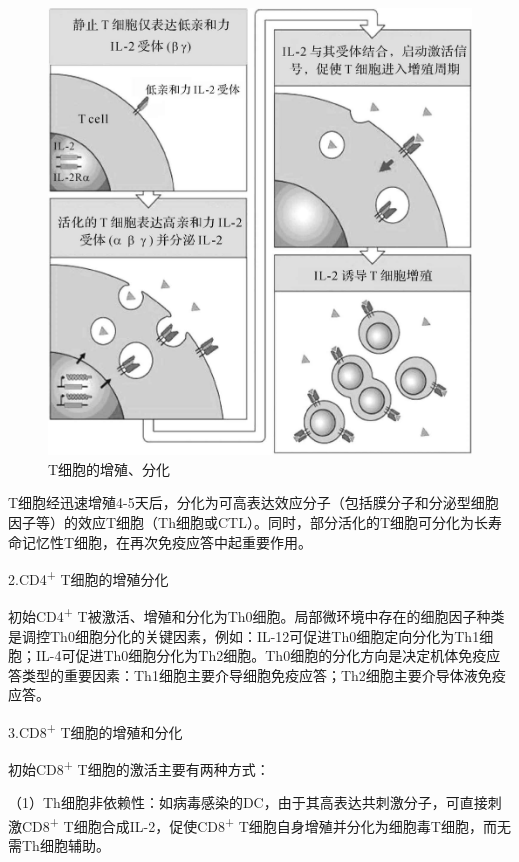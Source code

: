 \begin{figure}[!htbp]
 \centering
 \includegraphics{./images/Image00139.jpg}
 \captionsetup{justification=centering}
 \caption{T细胞的增殖、分化}
 \label{fig9-13}
  \end{figure} 

T细胞经迅速增殖4-5天后，分化为可高表达效应分子（包括膜分子和分泌型细胞因子等）的效应T细胞（Th细胞或CTL）。同时，部分活化的T细胞可分化为长寿命记忆性T细胞，在再次免疫应答中起重要作用。

2.CD4\textsuperscript{+} T细胞的增殖分化

初始CD4\textsuperscript{+}
T被激活、增殖和分化为Th0细胞。局部微环境中存在的细胞因子种类是调控Th0细胞分化的关键因素，例如：IL-12可促进Th0细胞定向分化为Th1细胞；IL-4可促进Th0细胞分化为Th2细胞。Th0细胞的分化方向是决定机体免疫应答类型的重要因素：Th1细胞主要介导细胞免疫应答；Th2细胞主要介导体液免疫应答。

3.CD8\textsuperscript{+} T细胞的增殖和分化

初始CD8\textsuperscript{+} T细胞的激活主要有两种方式：

（1）Th细胞非依赖性：如病毒感染的DC，由于其高表达共刺激分子，可直接刺激CD8\textsuperscript{+}
T细胞合成IL-2，促使CD8\textsuperscript{+}
T细胞自身增殖并分化为细胞毒T细胞，而无需Th细胞辅助。

